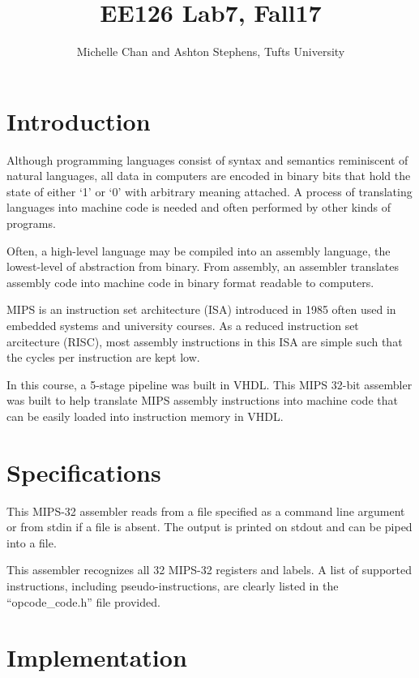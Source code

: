 \documentclass[titlepage]{article}
\title{EE126 Lab7, Fall17}
\author{Michelle Chan and Ashton Stephens, Tufts University}
\begin{document}
\begin{titlepage}
\maketitle
\end{titlepage}

\section*{Introduction}

Although programming languages consist of syntax and semantics reminiscent 
of natural languages, all data in computers are encoded in binary bits that
hold the state of either `1' or `0' with arbitrary meaning attached. A process
of translating languages into machine code is needed and often performed by
other kinds of programs. 

Often, a high-level language may be compiled into an assembly language, the 
lowest-level of abstraction from binary. From assembly, an assembler translates 
assembly code into machine code in binary format readable to computers. 

MIPS is an instruction set architecture (ISA) introduced in 1985 often used in 
embedded systems and university courses. As a reduced instruction set 
arcitecture (RISC), most assembly instructions in this ISA are simple such that
the cycles per instruction are kept low. 

In this course, a 5-stage pipeline was built in VHDL. This MIPS 32-bit assembler
was built to help translate MIPS assembly instructions into machine code that 
can be easily loaded into instruction memory in VHDL. 

\section*{Specifications}
This MIPS-32 assembler reads from a file specified as a command line argument
or from stdin if a file is absent. The output is printed on stdout and can be
piped into a file.

This assembler recognizes all 32 MIPS-32 registers and labels. A list of 
supported instructions, including pseudo-instructions, are clearly listed in the
``opcode\_code.h'' file provided.

\section*{Implementation}
\end{document}

